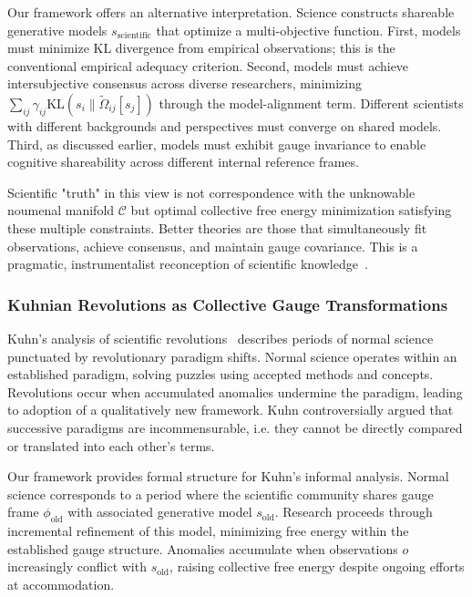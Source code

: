 \documentclass[11pt]{article}
\begin{document}
Our framework offers an alternative interpretation. Science constructs shareable generative models $s_{\text{scientific}}$ that optimize a multi-objective function. First, models must minimize KL divergence from empirical observations; this is the conventional empirical adequacy criterion. Second, models must achieve intersubjective consensus across diverse researchers, minimizing $\sum_{ij} \gamma_{ij}\mathrm{KL}(s_i \| \tilde{\Omega}_{ij}[s_j])$ through the model-alignment term. Different scientists with different backgrounds and perspectives must converge on shared models. Third, as discussed earlier, models must exhibit gauge invariance to enable cognitive shareability across different internal reference frames.

Scientific "truth" in this view is not correspondence with the unknowable noumenal manifold $\mathcal{C}$ but optimal collective free energy minimization satisfying these multiple constraints. Better theories are those that simultaneously fit observations, achieve consensus, and maintain gauge covariance. This is a pragmatic, instrumentalist reconception of scientific knowledge~\cite{vanFraassen1980, Laudan1984}.

\subsubsection{Kuhnian Revolutions as Collective Gauge Transformations}

Kuhn's analysis of scientific revolutions~\cite{Kuhn1962} describes periods of normal science punctuated by revolutionary paradigm shifts. Normal science operates within an established paradigm, solving puzzles using accepted methods and concepts. Revolutions occur when accumulated anomalies undermine the paradigm, leading to adoption of a qualitatively new framework. Kuhn controversially argued that successive paradigms are incommensurable, i.e. they cannot be directly compared or translated into each other's terms.

Our framework provides formal structure for Kuhn's informal analysis. Normal science corresponds to a period where the scientific community shares gauge frame $\phi_{\text{old}}$ with associated generative model $s_{\text{old}}$. Research proceeds through incremental refinement of this model, minimizing free energy within the established gauge structure. Anomalies accumulate when observations $o$ increasingly conflict with $s_{\text{old}}$, raising collective free energy despite ongoing efforts at accommodation.
\end{document}
